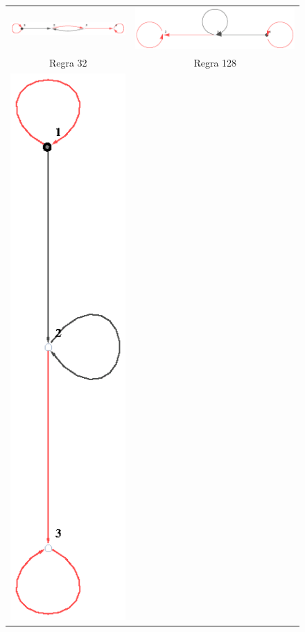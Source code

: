 \documentclass[12pt,a4paper]{article}
\begin{document}
\begin{figure}[H]
\begin{tabular}{c c}
\includegraphics[scale=0.7]{img/limit32} &
\includegraphics[scale=0.6]{img/limit128} \\
Regra 32 & Regra 128 \\
\includegraphics[scale=0.7]{img/limit136} &

\end{tabular}
\end{figure}
\end{document}
